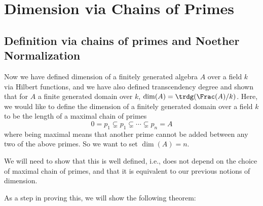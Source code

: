 \documentclass[12 pt]{article}
\theoremstyle{definition}
\begin{document}
\newpage




\section{Dimension via Chains of Primes}


\subsection{Definition via chains of primes and Noether Normalization}

Now we have defined dimension of a finitely generated algebra $A$ over a field $k$ via Hilbert functions, and we have also defined transcendency degree and shown that for $A$ a finite generated domain over $k$, $\dim(A)=\trdg(\Frac(A)/k)$. Here, we would like to define the dimension of a finitely generated domain over a field $k$ to be the length of a maximal chain of primes
\[0 =p_1 \subsetneq p_1 \subsetneq \cdots \subsetneq p_n=A\]
where being maximal means that another prime cannot be added between any two of the above primes. So we want to set $\dim(A)=n$.

We will need to show that this is well defined, i.e., does not depend on the choice of maximal chain of primes, and that it is equivalent to our previous notions of dimension.

As a step in proving this, we will show the following theorem:
\end{document}
